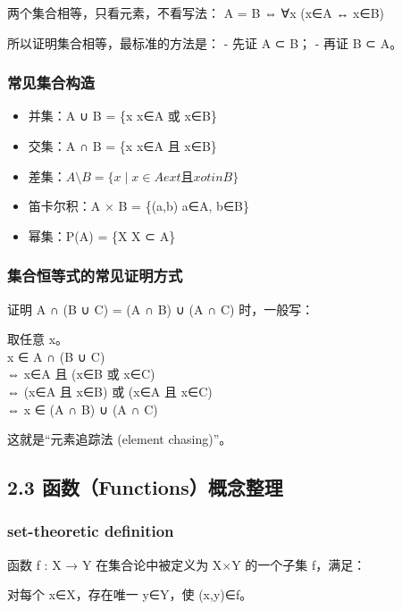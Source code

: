 \documentclass[
  11pt,
]{article}
\providecommand{\tightlist}{%
  \setlength{\itemsep}{0pt}\setlength{\parskip}{0pt}}
\begin{document}
两个集合相等，只看元素，不看写法： A = B ⇔ ∀x (x∈A ↔ x∈B)

所以证明集合相等，最标准的方法是： - 先证 A ⊂ B； - 再证 B ⊂ A。

\subsubsection{常见集合构造}\label{ux5e38ux89c1ux96c6ux5408ux6784ux9020}

\begin{itemize}
\tightlist
\item
  并集：A ∪ B = \{x \textbar{} x∈A 或 x∈B\}
\item
  交集：A ∩ B = \{x \textbar{} x∈A 且 x∈B\}
\item
  差集：\(A\setminus B=\{x\mid x\in A   ext{ 且 } x
  otin B\}\)
\item
  笛卡尔积：A × B = \{(a,b) \textbar{} a∈A, b∈B\}
\item
  幂集：P(A) = \{X \textbar{} X ⊂ A\}
\end{itemize}

\subsubsection{集合恒等式的常见证明方式}\label{ux96c6ux5408ux6052ux7b49ux5f0fux7684ux5e38ux89c1ux8bc1ux660eux65b9ux5f0f}

证明 A ∩ (B ∪ C) = (A ∩ B) ∪ (A ∩ C) 时，一般写：

取任意 x。\\
x ∈ A ∩ (B ∪ C)\\
⇔ x∈A 且 (x∈B 或 x∈C)\\
⇔ (x∈A 且 x∈B) 或 (x∈A 且 x∈C)\\
⇔ x ∈ (A ∩ B) ∪ (A ∩ C)

这就是``元素追踪法 (element chasing)''。

\subsection{2.3
函数（Functions）概念整理}\label{ux51fdux6570functionsux6982ux5ff5ux6574ux7406}

\subsubsection{set-theoretic definition}\label{set-theoretic-definition}

函数 f : X → Y 在集合论中被定义为 X×Y 的一个子集 f，满足：

对每个 x∈X，存在唯一 y∈Y，使 (x,y)∈f。
\end{document}
